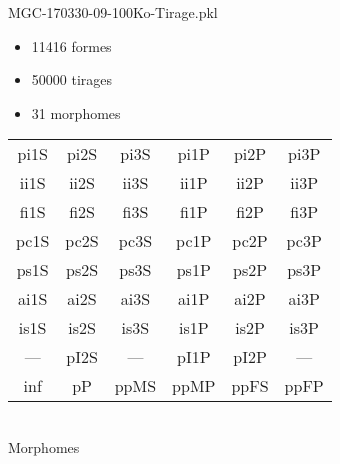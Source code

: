 MGC-170330-09-100Ko-Tirage.pkl
\begin{itemize}
\item 11416 formes
\item 50000 tirages
\item 31 morphomes
\end{itemize}
\begin{center}
\begin{tabular}{cccccc}
\hline
\cellcolor{white}pi1S & \cellcolor{orange}pi2S & \cellcolor{orange}pi3S & \cellcolor{white}pi1P & \cellcolor{white}pi2P & \cellcolor{white}pi3P\\
\cellcolor{brown}ii1S & \cellcolor{brown}ii2S & \cellcolor{brown}ii3S & \cellcolor{white}ii1P & \cellcolor{white}ii2P & \cellcolor{brown}ii3P\\
\cellcolor{yellow}fi1S & \cellcolor{lime}fi2S & \cellcolor{lime}fi3S & \cellcolor{green}fi1P & \cellcolor{white}fi2P & \cellcolor{green}fi3P\\
\cellcolor{yellow}pc1S & \cellcolor{yellow}pc2S & \cellcolor{yellow}pc3S & \cellcolor{white}pc1P & \cellcolor{white}pc2P & \cellcolor{yellow}pc3P\\
\cellcolor{teal}ps1S & \cellcolor{white}ps2S & \cellcolor{teal}ps3S & \cellcolor{white}ps1P & \cellcolor{white}ps2P & \cellcolor{teal}ps3P\\
\cellcolor{white}ai1S & \cellcolor{lightgray}ai2S & \cellcolor{lightgray}ai3S & \cellcolor{white}ai1P & \cellcolor{pink}ai2P & \cellcolor{white}ai3P\\
\cellcolor{black}is1S & \cellcolor{pink}is2S & \cellcolor{lightgray}is3S & \cellcolor{pink}is1P & \cellcolor{black}is2P & \cellcolor{pink}is3P\\
--- & \cellcolor{white}pI2S & --- & \cellcolor{white}pI1P & \cellcolor{white}pI2P & ---\\
\cellcolor{white}inf & \cellcolor{white}pP & \cellcolor{white}ppMS & \cellcolor{white}ppMP & \cellcolor{white}ppFS & \cellcolor{pink}ppFP\\
\hline
\end{tabular}\\
Morphomes
\end{center}
\bigskip

